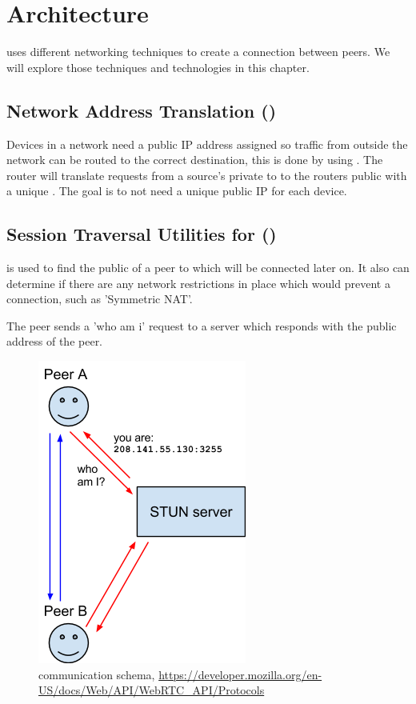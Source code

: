 \section{Architecture}
 uses different networking techniques to create a connection between peers. We will explore those techniques and technologies in this chapter.

\subsection{Network Address Translation ()}
Devices in a network need a public IP address assigned so traffic from outside the network can be routed to the correct destination, this is done by using . The router will translate requests from a source's private  to to the routers public  with a unique . The goal is to not need a unique public IP for each device.

\subsection{Session Traversal Utilities for  ()}
 is used to find the public  of a peer to which will be connected later on. It also can determine if there are any network restrictions in place which would prevent a connection, such as 'Symmetric NAT'.

The peer sends a 'who am i' request to a  server which responds with the public address of the peer.

\begin{figure}[H]
	\includegraphics[scale=0.5]{images/webrtc-stun.png}
	\centering
	\caption{ communication schema, \url{https://developer.mozilla.org/en-US/docs/Web/API/WebRTC_API/Protocols}}
	\label{fig:STUN}
\end{figure}

